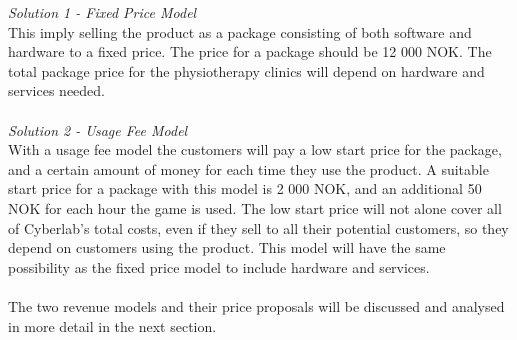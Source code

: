 \emph{Solution 1 - Fixed Price Model}\\  
This imply selling the product as a package consisting of both software and hardware to a fixed price. The price for a package should be 12 000 NOK. The total package price for the physiotherapy clinics will depend on hardware and services needed. \\ \\
\emph{Solution 2 - Usage Fee Model}\\
With a usage fee model the customers will pay a low start price for the package, and a certain amount of money for each time they use the product. A suitable start price for a package with this model is 2 000 NOK, and an additional 50 NOK for each hour the game is used. The low start price will not alone cover all of Cyberlab's total costs, even if they sell to all their potential customers, so they depend on customers using the product. This model will have the same possibility as the fixed price model to include hardware and services. \\ \\
The two revenue models and their price proposals will be discussed and analysed in more detail in the next section.

